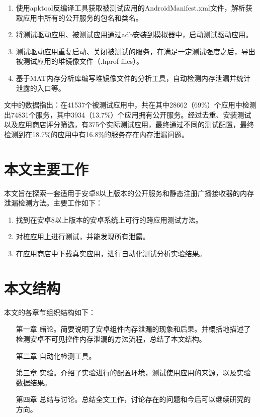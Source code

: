 \begin{enumerate}
	\item 使用apktool反编译工具\cite{apktool}获取被测试应用的AndroidManifest.xml文件，解析获取应用中所有的公开服务的包名和类名。
	\item 将测试驱动应用、被测试应用通过adb安装到模拟器中，启动测试驱动应用。
	\item 测试驱动应用重复启动、关闭被测试的服务，在满足一定测试强度之后，导出被测试应用的堆镜像文件（.hprof files）。
	\item 基于MAT内存分析库\cite{mat}编写堆镜像文件的分析工具，自动检测内存泄漏并统计泄露的入口等。
\end{enumerate}

\label{pre-result}
文中的数据指出：在41537个被测试应用中，共在其中28662（69\%）个应用中检测出74831个服务，其中3934（13.7\%）个应用拥有公开服务。经过去重、安装测试以及应用商店评分筛选，有375个实际测试应用，最终通过不同的测试配置，最终检测到在18.7\%的应用中有16.8\%的服务存在内存泄漏问题。


\section{本文主要工作}
本文旨在探索一套适用于安卓8以上版本的公开服务和静态注册广播接收器的内存泄漏检测方法。主要工作如下：
\begin{enumerate}
\item 找到在安卓8以上版本的安卓系统上可行的跨应用测试方法。

\item 对桩应用上进行测试，并能发现所有泄露。

\item 在应用商店中下载真实应用，进行自动化测试分析实验结果。

\end{enumerate}
\section{本文结构}
本文的各章节组织结构如下：
\begin{itemize}
	\item[第一章] 绪论。简要说明了安卓组件内存泄漏的现象和后果。并概括地描述了检测安卓不可见控件内存泄漏的方法流程，总结了本文结构。
	\item[第二章] 自动化检测工具。
	\item[第三章] 实验。介绍了实验进行的配置环境，测试使用应用的来源，以及实验数据结果。
	\item[第四章] 总结与讨论。总结全文工作，讨论存在的问题和今后可以继续研究的方向。
\end{itemize}